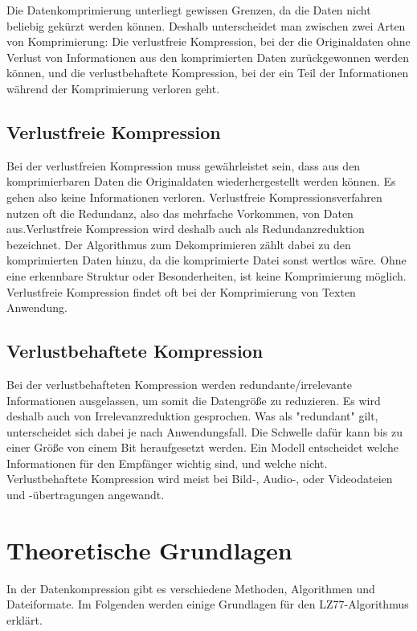 \documentclass[10pt, a4paper]{article}
\begin{document}
\noindent
Die Datenkomprimierung unterliegt gewissen Grenzen, da die Daten nicht beliebig gekürzt werden können. Deshalb unterscheidet man zwischen zwei Arten von Komprimierung: Die verlustfreie Kompression, bei der die Originaldaten ohne Verlust von Informationen aus den komprimierten Daten zurückgewonnen werden können, und die verlustbehaftete Kompression, bei der ein Teil der Informationen während der Komprimierung verloren geht. \cite{website:kompression}

\subsection{Verlustfreie Kompression}
Bei der verlustfreien Kompression muss gewährleistet sein, dass aus den komprimierbaren Daten die Originaldaten wiederhergestellt werden können. Es gehen also keine Informationen verloren. Verlustfreie Kompressionsverfahren nutzen oft die Redundanz, also das mehrfache Vorkommen, von Daten aus.Verlustfreie Kompression wird deshalb auch als Redundanzreduktion bezeichnet. Der Algorithmus zum Dekomprimieren zählt dabei zu den komprimierten Daten hinzu, da die komprimierte Datei sonst wertlos wäre. Ohne eine erkennbare Struktur oder Besonderheiten, ist keine Komprimierung möglich. Verlustfreie Kompression findet oft bei der Komprimierung von Texten Anwendung. \cite{website:kompression}

\subsection{Verlustbehaftete Kompression}
Bei der verlustbehafteten Kompression werden redundante/irrelevante Informationen ausgelassen, um somit die Datengröße zu reduzieren. Es wird deshalb auch von Irrelevanzreduktion gesprochen. Was als "redundant" gilt, unterscheidet sich dabei je nach Anwendungsfall. Die Schwelle dafür kann bis zu einer Größe von einem Bit heraufgesetzt werden. Ein Modell entscheidet welche Informationen für den Empfänger wichtig sind, und welche nicht. Verlustbehaftete Kompression wird meist bei Bild-, Audio-, oder Videodateien und -übertragungen angewandt. \cite{website:kompression}

\newpage
\section{Theoretische Grundlagen}
In der Datenkompression gibt es verschiedene Methoden, Algorithmen und Dateiformate. Im Folgenden werden einige Grundlagen für den LZ77-Algorithmus erklärt.
\end{document}
